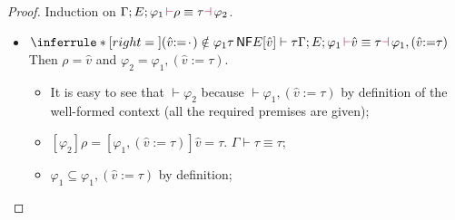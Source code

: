 \documentclass[a4,natbib=false]{article}
\newcommand{\ctxtapp}[2]{[{#1}] {#2}}
\newcommand{\evarassign}[2]{({#1} \mathsf{:=} {#2})}
\newcommand{\spcdot}{\mkern 2mu\cdot\mkern 2mu}
\newcommand{\judgectx}[2]{{#1} \vdash {#2}}
\newcommand{\judgesafeinenvv}[3]{{#1}[{#2}]  \vdash {#3}}
\newcommand{\judgeequivuntg}[3]{{#1} \vdash {#2} \equiv {#3}}
\newcommand{\judgeunify}[4]{{#1}\,{\color{purple}\vdash} {#2} \equiv {#3} {\color{purple}\dashv}\,{#4}}
\newcommand{\judgeSnf}[1]{{#1}\,\mathsf{NF}}
\newcommand{\Infer}[3]{\inferrule*[right={#1}]{#2}{#3}}
\begin{document}
\begin{proof}
  Induction on $\judgeunify{\Gamma; E; \varphi_1}{\rho}{\tau}{\varphi_2}$.
  \begin{itemize}
    \item
      $
      \Infer{}
      { 
        \evarassign{\hat{v}}{\spcdot} \notin \varphi_1 \\
        \judgeSnf{\tau} \\
        \judgesafeinenvv{E}{\hat{v}}{\tau}
      }
      {
        \judgeunify{\Gamma; E; \varphi_1}{\hat{v}}{\tau}{\varphi_1, \evarassign{\hat{v}}{\tau}}
      }
      $
      Then $\rho = \hat{v}$ and $\varphi_2 = \varphi_1, \evarassign{\hat{v}}{\tau}$.
      \begin{itemize}
        \item It is easy to see that $\judgectx{}{\varphi_2}$ because
          $\judgectx{}{\varphi_1, \evarassign{\hat{v}}{\tau}}$  by definition of the
          well-formed context (all the required premises are given);
        \item $\ctxtapp{\varphi_2}{\rho} = \ctxtapp{\varphi_1,
            \evarassign{\hat{v}}{\tau}}{\hat{v}} = \tau$.
          $\judgeequivuntg{\Gamma}{\tau}{\tau}$;
        \item $\varphi_1 \subseteq \varphi_1, \evarassign{\hat{v}}{\tau}$ by definition;


\end{itemize}
\end{itemize}
\end{proof}
\end{document}
